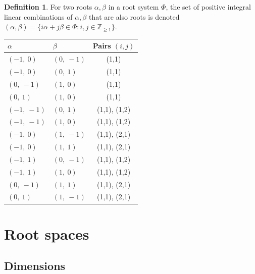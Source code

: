 \documentclass[11pt]{article}
\newcommand{\noi}{\noindent}
\theoremstyle{definition}
\newtheorem{definition}{Definition}[section]
\begin{document}
\begin{definition}
For two roots $\alpha, \beta$ in a root system $\Phi$, the set of positive integral linear combinations of $\alpha, \beta$ that are also roots is denoted
\(
	(\alpha, \beta) = \{ i \alpha + j \beta \in \Phi : i, j \in \mathbb{Z}_{\ge 1} \}
\).
\end{definition}
\noi \noindent \begin{longtable}{|l|l|c|}
    \hline
    $\alpha$ & $\beta$ & Pairs $(i,j)$ \\
    \hline
    \endhead
    $\left( -1, \  0\right)$ & $\left( 0, \  -1\right)$ & (1,1) \\
    \hline
    $\left( -1, \  0\right)$ & $\left( 0, \  1\right)$ & (1,1) \\
    \hline
    $\left( 0, \  -1\right)$ & $\left( 1, \  0\right)$ & (1,1) \\
    \hline
    $\left( 0, \  1\right)$ & $\left( 1, \  0\right)$ & (1,1) \\
    \hline
    $\left( -1, \  -1\right)$ & $\left( 0, \  1\right)$ & (1,1), (1,2) \\
    \hline
    $\left( -1, \  -1\right)$ & $\left( 1, \  0\right)$ & (1,1), (1,2) \\
    \hline
    $\left( -1, \  0\right)$ & $\left( 1, \  -1\right)$ & (1,1), (2,1) \\
    \hline
    $\left( -1, \  0\right)$ & $\left( 1, \  1\right)$ & (1,1), (2,1) \\
    \hline
    $\left( -1, \  1\right)$ & $\left( 0, \  -1\right)$ & (1,1), (1,2) \\
    \hline
    $\left( -1, \  1\right)$ & $\left( 1, \  0\right)$ & (1,1), (1,2) \\
    \hline
    $\left( 0, \  -1\right)$ & $\left( 1, \  1\right)$ & (1,1), (2,1) \\
    \hline
    $\left( 0, \  1\right)$ & $\left( 1, \  -1\right)$ & (1,1), (2,1) \\
    \hline
\end{longtable}

\fi

\newpage
\section{Root spaces}

\subsection{Dimensions}
\end{document}
